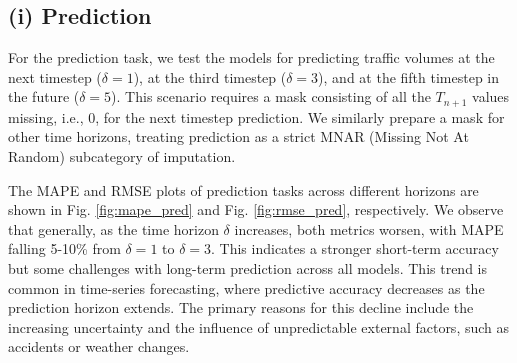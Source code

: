 \subsection*{(i) Prediction}

For the prediction task, we test the models for predicting traffic volumes at the next timestep (\(\delta = 1\)), at the third timestep (\(\delta = 3\)), and at the fifth timestep in the future (\(\delta = 5\)). This scenario requires a mask consisting of all the \(T_{n+1}\) values missing, i.e., 0, for the next timestep prediction. We similarly prepare a mask for other time horizons, treating prediction as a strict MNAR (Missing Not At Random) subcategory of imputation.

The MAPE and RMSE plots of prediction tasks across different horizons are shown in Fig. \ref{fig:mape_pred} and Fig. \ref{fig:rmse_pred}, respectively. We observe that generally, as the time horizon \(\delta\) increases, both metrics worsen, with MAPE falling 5-10\% from \(\delta=1\) to \(\delta=3\). This indicates a stronger short-term accuracy but some challenges with long-term prediction across all models. This trend is common in time-series forecasting, where predictive accuracy decreases as the prediction horizon extends. The primary reasons for this decline include the increasing uncertainty and the influence of unpredictable external factors, such as accidents or weather changes.

